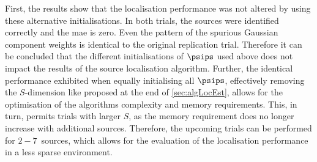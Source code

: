 First, the results show that the localisation performance was not altered by using these alternative initialisations. In both trials, the sources were identified correctly and the \gls{mae} is zero. Even the pattern of the spurious Gaussian component weights is identical to the original replication trial. Therefore it can be concluded that the different initialisations of $\psips$ used above does not impact the results of the source localisation algorithm. Further, the identical performance exhibited when equally initialising all $\psips$, effectively removing the $S$-dimension like proposed at the end of \autoref{sec:algLocEst}, allows for the optimisation of the algorithms complexity and memory requirements. This, in turn, permits trials with larger $S$, as the memory requirement does no longer increase with additional sources. Therefore, the upcoming trials can be performed for $2-7$~sources, which allows for the evaluation of the localisation performance in a less sparse environment. \FloatBarrier